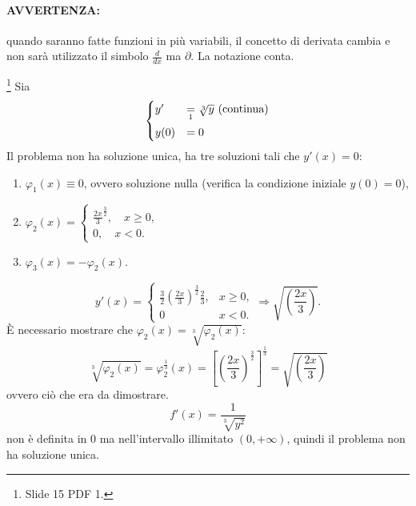 \paragraph{AVVERTENZA:} quando saranno fatte funzioni in più variabili, il concetto di derivata cambia e non sarà utilizzato il simbolo $\frac{d}{dx}$ ma $\partial$. La notazione conta.
\begin{example}
    \footnote{Slide 15 PDF 1.} Sia
    \begin{equation*}
        \begin{cases}
            y' &\underset{\footnotemark}{=} \sqrt[3]{y} \text{ (continua)}\\
            y(0) &=0
        \end{cases}
    \end{equation*}
    Il problema non ha soluzione unica, ha tre soluzioni tali che $y'(x)=0$:
    \begin{enumerate}
        \item $\varphi_1(x)\equiv 0$, ovvero soluzione nulla (verifica la condizione iniziale $y(0)=0$),
        \item $\varphi_2(x)=
        \begin{cases}
            \frac{2x}{3}^{\frac{3}{2}},\quad x\geq 0,\\
            0,\quad x<0.
        \end{cases}$
        \item $\varphi_3(x)=-\varphi_2(x).$
    \end{enumerate}
    \begin{equation*}
        y'(x) =
        \begin{cases}
            \frac{3}{2}\left(\frac{2x}{3}\right)^{\frac{3}{2}}\frac{2}{3}, &x\geq 0,\\
            0 & x<0.
        \end{cases}\Rightarrow \sqrt{\left(\frac{2x}{3}\right)}.
    \end{equation*}
    È necessario mostrare che $\varphi_2(x)=\sqrt[3]{\varphi_2(x)}$:
    \begin{equation*}
        \sqrt[3]{\varphi_2(x)}=\varphi_2^{\frac{1}{3}}(x)=\left[\left(\frac{2x}{3}\right)^{\frac{3}{2}}\right]^{\frac{1}{3}}=\sqrt{\left(\frac{2x}{3}\right)}
    \end{equation*}
    ovvero ciò che era da dimostrare.
    \begin{equation*}
        f'(x)=\frac{1}{\sqrt[3]{y^2}}
    \end{equation*}
    non è definita in 0 ma nell'intervallo illimitato $(0,+\infty)$, quindi il problema non ha soluzione unica.
\end{example}

